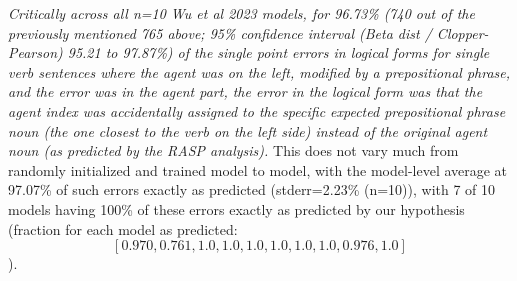 \documentclass[11pt]{article}
\begin{document}
\textit{Critically across all n=10 Wu et al 2023 models, for 96.73\% (740 out of the previously mentioned 765 above; 95\% confidence interval (Beta dist / Clopper-Pearson) 95.21 to 97.87\%) of the single point errors in logical forms for single verb sentences where the agent was on the left, modified by a prepositional phrase, and the error was in the agent part, the error in the logical form was that the agent index was accidentally assigned to the specific expected prepositional phrase noun (the one closest to the verb on the left side) instead of the original agent noun (as predicted by the RASP analysis).}
This does not vary much from randomly initialized and trained model to model, with the model-level average at 97.07\% of such errors exactly as predicted (stderr=2.23\% (n=10)), with 7 of 10 models having 100\% of these errors exactly as predicted by our hypothesis (fraction for each model as predicted: $$[0.970, 0.761, 1.0, 
1.0, 1.0, 1.0, 
1.0, 1.0, 0.976, 1.0]$$).
\end{document}
